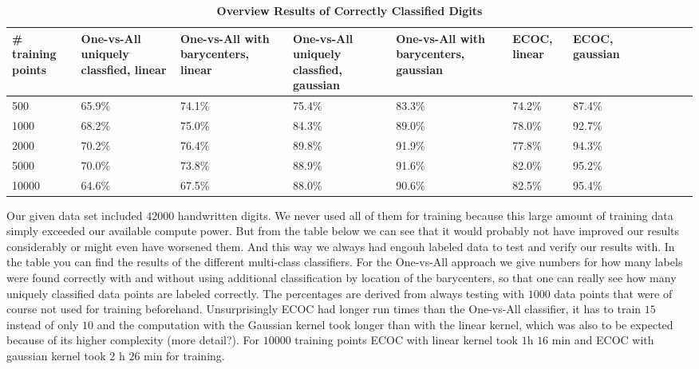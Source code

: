 \begin{table}[ht!]
	\centering
	\caption{\textbf{Overview Results of Correctly Classified Digits}}
	\begin{tabular}{|l|l|l|l|l|l|l|l|l|l|l|l|} \hline
		\multicolumn{1}{|p{1.8cm}|}{\vspace*{.7 cm}\# training points} &
		\multicolumn{1}{p{1.8cm}|}{\vspace*{.05 cm}One-vs-All uniquely classfied, linear} &
		\multicolumn{1}{p{1.8cm}|}{\vspace*{.15 cm}One-vs-All with barycenters, linear} &
		\multicolumn{1}{p{1.8cm}|}{\vspace*{.05 cm}One-vs-All uniquely classfied, gaussian} &
		\multicolumn{1}{p{1.8cm}|}{\vspace*{.0 cm}One-vs-All with barycenters, gaussian} &
		\multicolumn{1}{p{1.8cm}|}{\vspace*{.7 cm}ECOC, linear} &
		\multicolumn{1}{p{1.8cm}|}{\vspace*{.7 cm}ECOC, gaussian} \\ \hline \hline
		500	& 65.9\% & 74.1\% & 75.4\% & 83.3\% & 74.2\% & 87.4\% \\ \hline
		1000	& 68.2\% & 75.0\% & 84.3\% & 89.0\% & 78.0\% & 92.7\% \\ \hline
		2000	& 70.2\% & 76.4\% & 89.8\% & 91.9\% & 77.8\% & 94.3\% \\ \hline
		5000	& 70.0\% & 73.8\% & 88.9\% & 91.6\% & 82.0\% & 95.2\% \\ \hline
		10000	& 64.6\% & 67.5\% & 88.0\% & 90.6\% & 82.5\% & 95.4\% \\ \hline
	\end{tabular}
\end{table}

\smallskip
Our given data set included $42 000$ handwritten digits. We never used all of them for training because this large amount of training data simply exceeded our available compute power. But from the table below we can see that it would probably not have improved our results considerably or might even have worsened them. And this way we always had engouh labeled data to test and verify our results with. In the table you can find the results of the different multi-class classifiers. For the One-vs-All approach we give numbers for how many labels were found correctly with and without using additional classification by location of the barycenters, so that one can really see how many uniquely classified data points are labeled correctly. The percentages are derived from always testing with $1000$ data points that were of course not used for training beforehand. Unsurprisingly ECOC had longer run times than the One-vs-All classifier, it has to train $15$ instead of only $10$ and the computation with the Gaussian kernel took longer than with the linear kernel, which was also to be expected because of its higher complexity (more detail?). For $10 000$ training points ECOC with linear kernel took $1$h $16$ min and ECOC with gaussian kernel took $2$ h $26$ min for training.  

